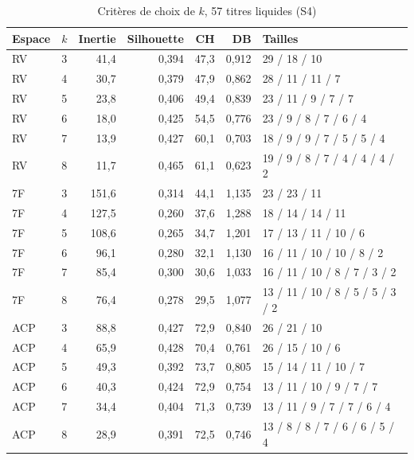 \documentclass[11pt,a4paper]{article}
\begin{document}
\begin{table}[H]\centering\small
\caption{Critères de choix de $k$, 57 titres liquides (S4)}\label{tab:annexe-k57}
\begin{tabular}{llrrrrl}\toprule
Espace & $k$ & Inertie & Silhouette & CH & DB & Tailles \\ \midrule
RV & 3 & 41{,}4 & 0{,}394 & 47{,}3 & 0{,}912 & 29 / 18 / 10 \\
RV & 4 & 30{,}7 & 0{,}379 & 47{,}9 & 0{,}862 & 28 / 11 / 11 / 7 \\
RV & 5 & 23{,}8 & 0{,}406 & 49{,}4 & 0{,}839 & 23 / 11 / 9 / 7 / 7 \\
RV & 6 & 18{,}0 & 0{,}425 & 54{,}5 & 0{,}776 & 23 / 9 / 8 / 7 / 6 / 4 \\
RV & 7 & 13{,}9 & 0{,}427 & 60{,}1 & 0{,}703 & 18 / 9 / 9 / 7 / 5 / 5 / 4 \\
RV & 8 & 11{,}7 & 0{,}465 & 61{,}1 & 0{,}623 & 19 / 9 / 8 / 7 / 4 / 4 / 4 / 2 \\
\midrule
7F & 3 & 151{,}6 & 0{,}314 & 44{,}1 & 1{,}135 & 23 / 23 / 11 \\
7F & 4 & 127{,}5 & 0{,}260 & 37{,}6 & 1{,}288 & 18 / 14 / 14 / 11 \\
7F & 5 & 108{,}6 & 0{,}265 & 34{,}7 & 1{,}201 & 17 / 13 / 11 / 10 / 6 \\
7F & 6 & 96{,}1 & 0{,}280 & 32{,}1 & 1{,}130 & 16 / 11 / 10 / 10 / 8 / 2 \\
7F & 7 & 85{,}4 & 0{,}300 & 30{,}6 & 1{,}033 & 16 / 11 / 10 / 8 / 7 / 3 / 2 \\
7F & 8 & 76{,}4 & 0{,}278 & 29{,}5 & 1{,}077 & 13 / 11 / 10 / 8 / 5 / 5 / 3 / 2 \\
\midrule
ACP & 3 & 88{,}8 & 0{,}427 & 72{,}9 & 0{,}840 & 26 / 21 / 10 \\
ACP & 4 & 65{,}9 & 0{,}428 & 70{,}4 & 0{,}761 & 26 / 15 / 10 / 6 \\
ACP & 5 & 49{,}3 & 0{,}392 & 73{,}7 & 0{,}805 & 15 / 14 / 11 / 10 / 7 \\
ACP & 6 & 40{,}3 & 0{,}424 & 72{,}9 & 0{,}754 & 13 / 11 / 10 / 9 / 7 / 7 \\
ACP & 7 & 34{,}4 & 0{,}404 & 71{,}3 & 0{,}739 & 13 / 11 / 9 / 7 / 7 / 6 / 4 \\
ACP & 8 & 28{,}9 & 0{,}391 & 72{,}5 & 0{,}746 & 13 / 8 / 8 / 7 / 6 / 6 / 5 / 4 \\
\bottomrule\end{tabular}\end{table}
\end{document}

